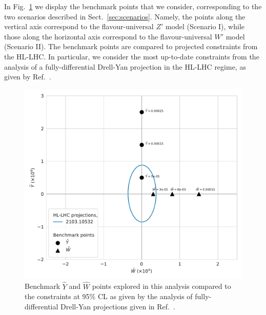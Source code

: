 \documentclass[withindex,glossary]{cam-thesis}
\begin{document}
In Fig.~\ref{fig:bps} we display the benchmark points that we
consider, corresponding to the two scenarios described in
Sect.~\ref{sec:scenarios}. Namely, the points along the vertical axis
correspond to the flavour-universal $Z'$ model (Scenario I), while
those along the horizontal axis correspond to the flavour-universal
$W'$ model (Scenario II). The benchmark points are compared to projected constraints
from the HL-LHC.  In particular, we consider the most up-to-date constraints 
from the analysis of a fully-differential Drell-Yan projection in the HL-LHC regime, as 
given by Ref.~\cite{Panico:2021vav}.
%
\begin{figure}[H]
\centering
  \includegraphics[width=0.48\linewidth]{Figures/contamination_fit_points_blue.pdf}
	\caption{\label{fig:bps} Benchmark $\hat{Y}$ and $\hat{W}$ points explored in this analysis compared to 
	the constraints at 95\% CL as given by the analysis of fully-differential Drell-Yan
 projections given in Ref.~\cite{Panico:2021vav}.}
      \end{figure}
%
\end{document}
